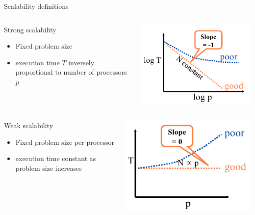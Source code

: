 \begin{frame}{Scalability definitions}
  \begin{columns}
    \begin{column}{0.5\textwidth}
      {\large Strong scalability}
      \begin{itemize}
      \item Fixed problem size
      \item execution time $T$ inversely proportional to number of processors $p$
      \end{itemize}
    \end{column}
    \begin{column}{0.5\textwidth}
      \includegraphics[width=\textwidth]{figures/KeyesStrongScaling.png}
    \end{column}
  \end{columns}
  \begin{columns}
    \begin{column}{0.5\textwidth}
      {\large Weak scalability}
      \begin{itemize}
      \item Fixed problem size per processor
      \item execution time constant as problem size increases
      \end{itemize}
    \end{column}
    \begin{column}{0.5\textwidth}
      \includegraphics[width=\textwidth]{figures/KeyesWeakScaling.png}

\end{column}
\end{columns}
\end{frame}
